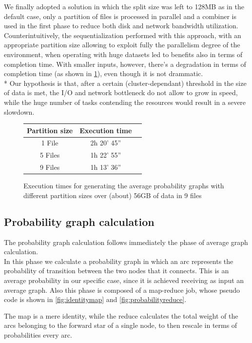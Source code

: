 We finally adopted a solution in which the split size was left to 128MB as in the default case, only a partition of files is processed in parallel and a combiner is used in the first phase to reduce both disk and network bandwidth utilization.
Counterintuitively, the sequentialization performed with this approach, with an appropriate partition size allowing to exploit fully the parallelism degree of the environment, when operating with huge datasets led to benefits also in terms of completion time. 
With smaller inputs, however, there's a degradation in terms of completion time (as shown in \ref{fig:partitioningtimes}), even though it is not drammatic.
\\*
Our hypothesis is that, after a certain (cluster-dependant) threshold in the size of data is met, the I/O and network bottleneck do not allow to grow in speed, while the huge number of tasks contending the resources would result in a severe slowdown.

\begin{figure}
\centering
\begin{tabular}{| c | c | r |}
\hline
\textbf{Partition size} & \textbf{Execution time} \\
\hline
1 File & 2h 20' 45'' \\
\hline
5 Files &  1h 22' 55''\\
\hline
9 Files & 1h 13' 36'' \\
\hline
\end{tabular}
\caption{Execution times for generating the average probability graphs with different partition sizes over (about) 56GB of data in 9 files}
\label{fig:partitioningtimes}
\end{figure}


\subsection{Probability graph calculation}
The probability graph calculation follows immediately the phase of average graph calculation.\\
In this phase we calculate a probability graph in which an arc represents the probability of transition between the two nodes that it connects. 
This is an average probability in our specific case, since it is achieved receiving as input an average graph.
Also this phase is composed of a map-reduce job, whose pseudo code is shown in \ref{fig:identitymap} and \ref{fig:probabilityreduce}.

The map is a mere identity, while the reduce calculates the total weight of the arcs belonging to the forward star of a single node, to then rescale in terms of probabilities every arc.
  
